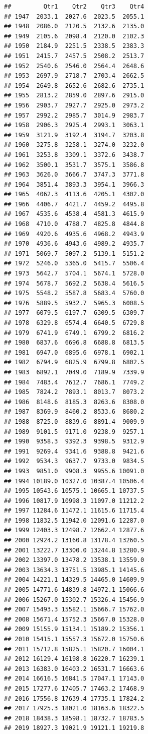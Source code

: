 \documentclass[
]{article}
\begin{document}
\begin{verbatim}
##         Qtr1    Qtr2    Qtr3    Qtr4
## 1947  2033.1  2027.6  2023.5  2055.1
## 1948  2086.0  2120.5  2132.6  2135.0
## 1949  2105.6  2098.4  2120.0  2102.3
## 1950  2184.9  2251.5  2338.5  2383.3
## 1951  2415.7  2457.5  2508.2  2513.7
## 1952  2540.6  2546.0  2564.4  2648.6
## 1953  2697.9  2718.7  2703.4  2662.5
## 1954  2649.8  2652.6  2682.6  2735.1
## 1955  2813.2  2859.0  2897.6  2915.0
## 1956  2903.7  2927.7  2925.0  2973.2
## 1957  2992.2  2985.7  3014.9  2983.7
## 1958  2906.3  2925.4  2993.1  3063.1
## 1959  3121.9  3192.4  3194.7  3203.8
## 1960  3275.8  3258.1  3274.0  3232.0
## 1961  3253.8  3309.1  3372.6  3438.7
## 1962  3500.1  3531.7  3575.1  3586.8
## 1963  3626.0  3666.7  3747.3  3771.8
## 1964  3851.4  3893.3  3954.1  3966.3
## 1965  4062.3  4113.6  4205.1  4302.0
## 1966  4406.7  4421.7  4459.2  4495.8
## 1967  4535.6  4538.4  4581.3  4615.9
## 1968  4710.0  4788.7  4825.8  4844.8
## 1969  4920.6  4935.6  4968.2  4943.9
## 1970  4936.6  4943.6  4989.2  4935.7
## 1971  5069.7  5097.2  5139.1  5151.2
## 1972  5246.0  5365.0  5415.7  5506.4
## 1973  5642.7  5704.1  5674.1  5728.0
## 1974  5678.7  5692.2  5638.4  5616.5
## 1975  5548.2  5587.8  5683.4  5760.0
## 1976  5889.5  5932.7  5965.3  6008.5
## 1977  6079.5  6197.7  6309.5  6309.7
## 1978  6329.8  6574.4  6640.5  6729.8
## 1979  6741.9  6749.1  6799.2  6816.2
## 1980  6837.6  6696.8  6688.8  6813.5
## 1981  6947.0  6895.6  6978.1  6902.1
## 1982  6794.9  6825.9  6799.8  6802.5
## 1983  6892.1  7049.0  7189.9  7339.9
## 1984  7483.4  7612.7  7686.1  7749.2
## 1985  7824.2  7893.1  8013.7  8073.2
## 1986  8148.6  8185.3  8263.6  8308.0
## 1987  8369.9  8460.2  8533.6  8680.2
## 1988  8725.0  8839.6  8891.4  9009.9
## 1989  9101.5  9171.0  9238.9  9257.1
## 1990  9358.3  9392.3  9398.5  9312.9
## 1991  9269.4  9341.6  9388.8  9421.6
## 1992  9534.3  9637.7  9733.0  9834.5
## 1993  9851.0  9908.3  9955.6 10091.0
## 1994 10189.0 10327.0 10387.4 10506.4
## 1995 10543.6 10575.1 10665.1 10737.5
## 1996 10817.9 10998.3 11097.0 11212.2
## 1997 11284.6 11472.1 11615.6 11715.4
## 1998 11832.5 11942.0 12091.6 12287.0
## 1999 12403.3 12498.7 12662.4 12877.6
## 2000 12924.2 13160.8 13178.4 13260.5
## 2001 13222.7 13300.0 13244.8 13280.9
## 2002 13397.0 13478.2 13538.1 13559.0
## 2003 13634.3 13751.5 13985.1 14145.6
## 2004 14221.1 14329.5 14465.0 14609.9
## 2005 14771.6 14839.8 14972.1 15066.6
## 2006 15267.0 15302.7 15326.4 15456.9
## 2007 15493.3 15582.1 15666.7 15762.0
## 2008 15671.4 15752.3 15667.0 15328.0
## 2009 15155.9 15134.1 15189.2 15356.1
## 2010 15415.1 15557.3 15672.0 15750.6
## 2011 15712.8 15825.1 15820.7 16004.1
## 2012 16129.4 16198.8 16220.7 16239.1
## 2013 16383.0 16403.2 16531.7 16663.6
## 2014 16616.5 16841.5 17047.1 17143.0
## 2015 17277.6 17405.7 17463.2 17468.9
## 2016 17556.8 17639.4 17735.1 17824.2
## 2017 17925.3 18021.0 18163.6 18322.5
## 2018 18438.3 18598.1 18732.7 18783.5
## 2019 18927.3 19021.9 19121.1 19219.8
\end{verbatim}
\end{document}
